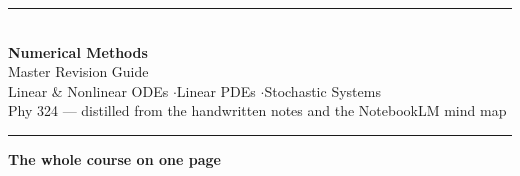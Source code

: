 \documentclass[10.5pt,a4paper]{article}
\begin{document}
\begin{center}
{\color{navy}\rule{\linewidth}{2pt}}\\[0.5em]
{\Huge\bfseries Numerical Methods}\\[16pt]
{\LARGE Master Revision Guide}\\[8pt]
{\large Linear \& Nonlinear ODEs \quad$\cdot$\quad Linear PDEs \quad$\cdot$\quad Stochastic Systems}\\[3pt]
{\small Phy 324 --- distilled from the handwritten notes and the NotebookLM mind map}\\[0.4em]
{\color{navy}\rule{\linewidth}{2pt}}
\end{center}

\vspace{0.2em}
{\color{navy}\Large\bfseries The whole course on one page}
\end{document}
